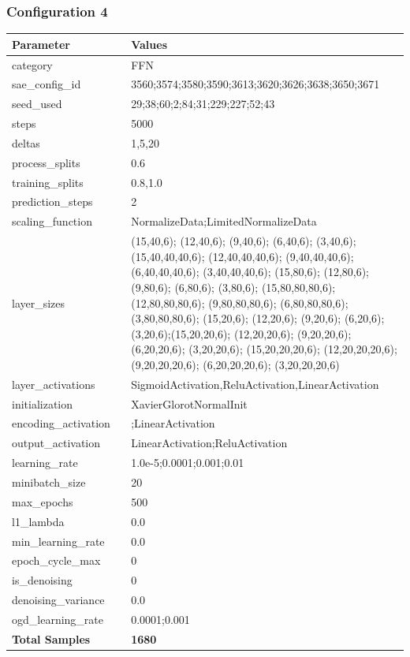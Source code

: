 \documentclass[a4paper,11pt,oneside]{article}
\theoremstyle{plain}
\theoremstyle{definition}
\begin{document}
	\newpage
	\subsubsection{Configuration 4}\label{config4}
	\begin{longtable}[H]{|p{0.3\linewidth}|p{0.7\linewidth}|} \hline 			\rowcolor{beaublue}\textbf{Parameter} &\textbf{Values} \\\hline{category} & {FFN} \\\hline
		{sae\_config\_id} & {3560;3574;3580;3590;3613;3620;3626;3638;3650;3671} \\\hline
		{seed\_used} & {29;38;60;2;84;31;229;227;52;43} \\\hline
		{steps} & {5000} \\\hline
		{deltas} & {1,5,20} \\\hline
		{process\_splits} & {0.6} \\\hline
		{training\_splits} & {0.8,1.0} \\\hline
		{prediction\_steps} & {2} \\\hline
		{scaling\_function} & {NormalizeData;LimitedNormalizeData} \\\hline
		{layer\_sizes} & {(15,40,6); (12,40,6); (9,40,6); (6,40,6); (3,40,6); (15,40,40,40,6); (12,40,40,40,6); (9,40,40,40,6); (6,40,40,40,6); (3,40,40,40,6); (15,80,6); (12,80,6); (9,80,6); (6,80,6); (3,80,6); (15,80,80,80,6); (12,80,80,80,6); (9,80,80,80,6); (6,80,80,80,6); (3,80,80,80,6); (15,20,6); (12,20,6); (9,20,6); (6,20,6); (3,20,6);(15,20,20,6); (12,20,20,6); (9,20,20,6); (6,20,20,6); (3,20,20,6); (15,20,20,20,6); (12,20,20,20,6); (9,20,20,20,6); (6,20,20,20,6); (3,20,20,20,6)} \\\hline
		{layer\_activations} & {SigmoidActivation,ReluActivation,LinearActivation} \\\hline
		{initialization} & {XavierGlorotNormalInit} \\\hline
		{encoding\_activation} & {;LinearActivation} \\\hline
		{output\_activation} & {LinearActivation;ReluActivation} \\\hline
		{learning\_rate} & {1.0e-5;0.0001;0.001;0.01} \\\hline
		{minibatch\_size} & {20} \\\hline
		{max\_epochs} & {500} \\\hline
		{l1\_lambda} & {0.0} \\\hline
		{min\_learning\_rate} & {0.0} \\\hline
		{epoch\_cycle\_max} & {0} \\\hline
		{is\_denoising} & {0} \\\hline
		{denoising\_variance} & {0.0} \\\hline
		{ogd\_learning\_rate} & {0.0001;0.001} \\\hline
		{\textbf{Total Samples}} & {\textbf{1680}} \\\hline
	\end{longtable}
	
\end{document}
